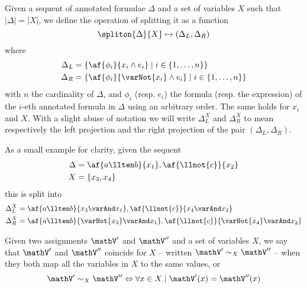 \begin{define}[Splitting]
	\label{def:split}
	Given a sequent of annotated formulae $\Delta$ and a set of variables $X$ such that $|\Delta| = |X|$, we define the operation of splitting it as a function
	$$ \spliton{\Delta}{X} \mapsto (\Delta_L, \Delta_R) $$
	where
	\begin{align*}
		\Delta_L &= \{ \af{\phi_i}{x_i \wedge e_i} \mid i \in \{1, \dots, n\}\} \\
		\Delta_R &= \{ \af{\phi_i}{\varNot{x_i} \wedge e_i} \mid i \in \{1, \dots, n\}\}
	\end{align*}
	with $n$ the cardinality of $\Delta$, and $\phi_i$ (resp. $e_i$) the formula (resp. the expression) of the $i$-eth annotated formula in $\Delta$ using an arbitrary order.
	The same holds for $x_i$ and $X$.
	With a slight abuse of notation we will write $\Delta_L^X$ and $\Delta_R^X$ to mean respectively the left projection and the right projection of the pair $(\Delta_L, \Delta_R)$.
\end{define}
As a small example for clarity, given the sequent
\begin{align*}
	\Delta &= \af{a \llten b}{x_1}, \af{\llnot{c}}{x_2} \\
	X      &= \{ x_3, x_4 \} 
\end{align*}
this is split into
\begin{align*}
	\Delta_L^X &= \af{a \llten b}{x_3 \varAnd x_1}, \af{\llnot{c}}{x_4 \varAnd x_2} \\
	\Delta_R^X &= \af{a \llten b}{\varNot{x_3} \varAnd x_1}, \af{\llnot{c}}{\varNot{x_4} \varAnd x_2} 
\end{align*}

\begin{define}
	Given two assignments $\mathV'$ and $\mathV''$ and a set of variables $X$, we say that $\mathV'$ and $\mathV''$ coincide for $X$ -- written $\mathV' \sim_X \mathV''$ -- when they both map all the variables in $X$ to the same values, or
	$$ \mathV' \sim_X \mathV'' \Leftrightarrow \forall x \in X \mid \mathV'(x) = \mathV''(x) $$
\end{define}

